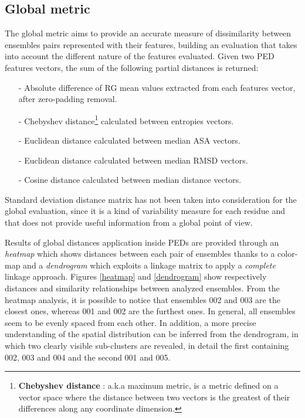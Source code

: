 \subsection{Global metric}
The global metric aims to provide an accurate measure of dissimilarity between ensembles pairs represented with their features, building an evaluation that takes into account the different nature of the features evaluated. Given two PED features vectors, the sum of the following partial distances is returned:
\begin{itemize}
\item[-] Absolute difference of RG mean values extracted from each features vector, after zero-padding removal.
\item[-] Chebyshev distance\footnote{\textbf{Chebyshev distance} : a.k.a maximum metric, is a metric defined on a vector space where the distance between two vectors is the greatest of their differences along any coordinate dimension.} calculated between entropies vectors.
\item[-] Euclidean distance calculated between median ASA vectors.
\item[-] Euclidean distance calculated between median RMSD vectors.
\item[-] Cosine distance calculated between median distance vectors.
\end{itemize}

Standard deviation distance matrix has not been taken into consideration for the global evaluation, since it is a kind of variability measure for each residue and that does not provide useful information from a global point of view.

Results of global distances application inside PEDs are provided through an \emph{heatmap} which shows distances between each pair of ensembles thanks to a color-map and a \emph{dendrogram} which exploits a linkage matrix to apply a \emph{complete} linkage approach.
Figures \ref{heatmap} and \ref{dendrogram} show respectively distances and similarity relationships between analyzed ensembles. From the heatmap analysis, it is possible to notice that ensembles 002 and 003 are the closest ones, whereas 001 and 002 are the furthest ones. In general, all ensembles seem to be evenly spaced from each other. In addition, a more precise understanding of the spatial distribution can be inferred from the dendrogram, in which two clearly visible sub-clusters are revealed, in detail the first containing 002, 003 and 004 and the second 001 and 005.

